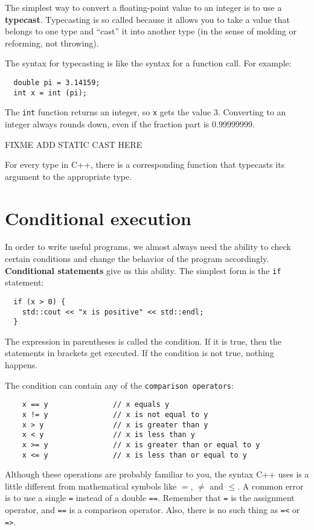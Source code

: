 The simplest way to convert a floating-point value to an integer is to
use a {\bf typecast}.  Typecasting is so called because it allows you
to take a value that belongs to one type and ``cast'' it into another
type (in the sense of molding or reforming, not throwing).

The syntax for typecasting is like the syntax
for a function call.  For example:

\begin{verbatim}
  double pi = 3.14159;
  int x = int (pi);
\end{verbatim}
%
The {\tt int} function returns an integer, so {\tt x} gets the value
3.  Converting to an integer always rounds down, even if the fraction
part is 0.99999999.

FIXME ADD STATIC CAST HERE

For every type in C++, there is a corresponding function that
typecasts its argument to the appropriate type.

\section{Conditional execution}

In order to write useful programs, we almost always need the ability
to check certain conditions and change the behavior of the program
accordingly.  {\bf Conditional statements} give us this ability.  The
simplest form is the {\tt if} statement:

\begin{lstlisting}
  if (x > 0) {
    std::cout << "x is positive" << std::endl;
  }
\end{lstlisting}
%
The expression in parentheses is called the condition.
If it is true, then the statements in brackets get executed.
If the condition is not true, nothing happens.


The condition can contain any of the {\tt comparison operators}:

\begin{lstlisting}
    x == y               // x equals y
    x != y               // x is not equal to y
    x > y                // x is greater than y
    x < y                // x is less than y
    x >= y               // x is greater than or equal to y
    x <= y               // x is less than or equal to y
\end{lstlisting}
%
Although these operations are probably familiar to you, the
syntax C++ uses is a little different from mathematical
symbols like $=$, $\neq$ and $\le$.  A common error is
to use a single {\tt =} instead of a double {\tt ==}.  Remember
that {\tt =} is the assignment operator, and {\tt ==} is
a comparison operator.  Also, there is no such thing as
{\tt =<} or {\tt =>}.

